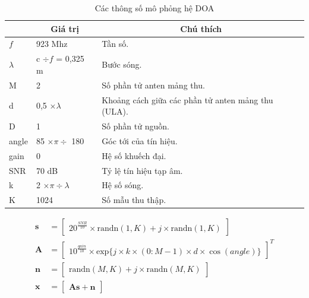 \begin{table}[!h]
	\caption{Các thông số mô phỏng hệ DOA}
	\centering
	\begin{tabular}{|l|l|l|}
		\hline
		\rowcolor[HTML]{FFECEA} 
		\multicolumn{1}{|c|}{\cellcolor[HTML]{FFECEA}\textbf{Thông số}} & \multicolumn{1}{c|}{\cellcolor[HTML]{FFECEA}\textbf{Giá trị}} & \multicolumn{1}{c|}{\cellcolor[HTML]{FFECEA}\textbf{Chú thích}} \\ \hline
		$f$ & 923 Mhz & Tần số. \\ \hline
		$\lambda$ & c $\div f$ = 0,325 m & Bước sóng. \\ \hline
		M & 2 & Số phần tử anten mảng thu. \\ \hline
		d & 0,5 $\times \lambda$ & Khoảng cách giữa các phần tử anten mảng thu (ULA). \\ \hline
		D & 1 & Số phần tử nguồn. \\ \hline
		angle & 85 $\times \pi \div$ 180 & Góc tới của tín hiệu. \\ \hline
		gain & 0 & Hệ số khuếch đại. \\ \hline
		SNR & 70 dB & Tỷ lệ tín hiệu tạp âm. \\ \hline
		k & 2 $\times \pi \div \lambda$ & Hệ số sóng. \\ \hline
		K & 1024 & Số mẫu thu thập. \\ \hline
	\end{tabular}
\label{parass}
\end{table}
\begin{subequations}
\label{eq:all}
\begin{align}
\label{eq:model_a}
    \mathbf{s} &=
    \begin{bmatrix}
   	20^{\frac{SNR}{10}}\times \mathrm{randn}(1, K) + j \times \mathrm{randn}(1, K)
    \end{bmatrix}\\
\label{eq:model_b}
    \mathbf{A} &=
    \begin{bmatrix}
	10^{\frac{gain}{10}} \times \mathrm{exp}\{j \times k \times (0:M-1) \times d \times \cos(angle)\}
    \end{bmatrix}^T \\
\label{eq:model_c}
 \mathbf{n} &=
    \begin{bmatrix}
	\mathrm{randn}(M, K) + j \times \mathrm{randn}(M, K)
    \end{bmatrix} \\
\label{eq:model_d}
 \mathbf{x} &=
    \begin{bmatrix}
	\mathbf{A}\mathbf{s} + \mathbf{n}
    \end{bmatrix}
\end{align}
\end{subequations}

